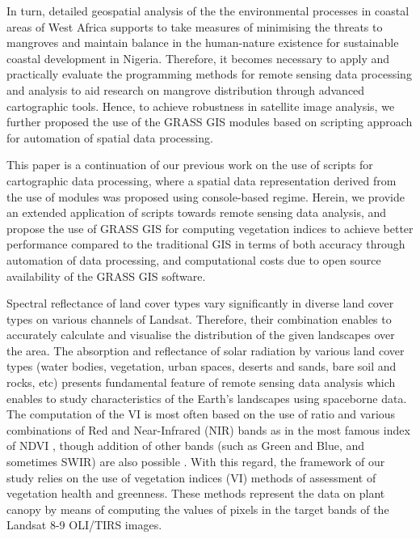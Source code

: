 \documentclass[jmse,article,submit,pdftex,moreauthors]{Definitions/mdpi}
\begin{document}
In turn, detailed geospatial analysis of the the  environmental processes in coastal areas of West Africa supports to take measures of minimising the threats to mangroves and maintain balance in the human-nature existence for sustainable coastal development in Nigeria. Therefore, it becomes necessary to apply and practically evaluate the programming methods for remote sensing data processing and analysis to aid research on mangrove distribution through advanced cartographic tools. Hence, to achieve robustness in satellite image analysis, we further proposed the use of the GRASS GIS modules based on scripting approach for automation of spatial data processing.

This paper is a continuation of our previous work \cite{Lemenkova202301,Lemenkova202228} on the use of scripts for cartographic data processing, where a spatial data representation derived from the use of modules was proposed using console-based regime. Herein, we provide an extended application of scripts towards remote sensing data analysis, and propose the use of GRASS GIS for computing vegetation indices to achieve better performance compared to the traditional GIS in terms of both accuracy through automation of data processing, and computational costs due to open source availability of the GRASS GIS software.

Spectral reflectance of land cover types vary significantly in diverse land cover types on various channels of Landsat. Therefore, their combination enables to accurately calculate and visualise the distribution of the given landscapes over the area. The absorption and reflectance of solar radiation by various land cover types (water bodies, vegetation, urban spaces, deserts and sands, bare soil and rocks, etc) presents fundamental feature of remote sensing data analysis which enables to study characteristics of the Earth's landscapes using spaceborne data. The computation of the VI is most often based on the use of ratio and various combinations of Red and Near-Infrared (NIR) bands as in the most famous index of NDVI \cite{alademomi2020assessing,NSE2020e00599}, though addition of other bands (such as Green and Blue, and sometimes SWIR) are also possible \cite{Adamu,rs10060897}. With this regard, the framework of our study relies on the use of vegetation indices (VI) methods of assessment of vegetation health and greenness. These methods represent the data on plant canopy by means of computing the values of pixels in the target bands of the Landsat 8-9 OLI/TIRS images. 
\end{document}
